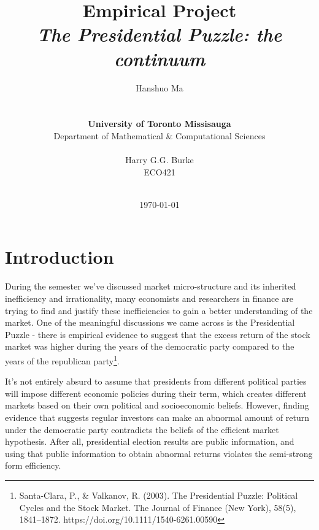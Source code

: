 \documentclass[a4paper]{article}
\begin{document}
\title{{\Huge \textbf{Empirical Project}{\large\linebreak\\}}{\Large \textit{The Presidential Puzzle: the continuum}\linebreak\linebreak}}

\author{Hanshuo Ma
\\ \\ \\
\textbf{University of Toronto Missisauga} \\
Department of Mathematical \& Computational Sciences \\ \\
Harry G.G. Burke \\
ECO421 \\ \\}
\date{\today}

\maketitle

\newpage
\tableofcontents\label{c}
\newpage

\section{Introduction} \label{Introduction} 
\vspace{-10pt}

  \hspace{12pt} During the semester we've discussed market micro-structure and its inherited inefficiency and irrationality, many economists and researchers in finance  are trying to find and justify these inefficiencies to gain a better understanding of the market. One of the meaningful discussions we came across is the Presidential Puzzle - there is empirical evidence to suggest that the excess return of the stock market was higher during the years of the democratic party compared to the years of the republican party\footnote{
  Santa-Clara, P., \& Valkanov, R. (2003). The Presidential Puzzle: Political Cycles and the Stock Market. The Journal of Finance (New York), 58(5), 1841–1872. https://doi.org/10.1111/1540-6261.00590}.

  It's not entirely absurd to assume that presidents from different political parties will impose different economic policies during their term, which creates different markets based on their own political and socioeconomic beliefs. However, finding evidence that suggests regular investors can make an abnormal amount of return under the democratic party contradicts the beliefs of the efficient market hypothesis. After all, presidential election results are public information, and using that public information to obtain abnormal returns violates the semi-strong form efficiency.
  
\end{document}
